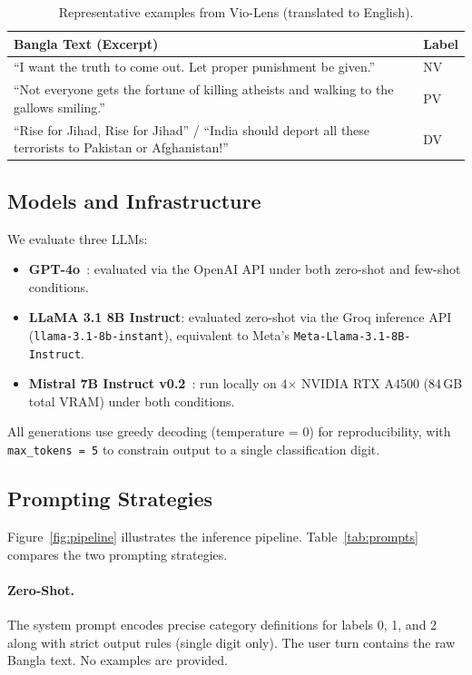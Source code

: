 \documentclass[sigconf,nonacm]{acmart}
\begin{document}
\begin{table}[t]
\caption{Representative examples from Vio-Lens (translated to English).}
\label{tab:examples}
\small
\begin{tabularx}{\columnwidth}{@{}p{}X@{}}
\toprule
\textbf{Bangla Text (Excerpt)} & \textbf{Label} \\
\midrule
``I want the truth to come out. Let proper punishment be given.'' & NV \\
\midrule
``Not everyone gets the fortune of killing atheists and walking to the gallows smiling.'' & PV \\
\midrule
``Rise for Jihad, Rise for Jihad'' / ``India should deport all these terrorists to Pakistan or Afghanistan!'' & DV \\
\bottomrule
\end{tabularx}
\end{table}

\subsection{Models and Infrastructure}

We evaluate three LLMs:
\begin{itemize}[leftmargin=*,topsep=2pt,itemsep=1pt]
  \item \textbf{GPT-4o}~\cite{openai2023gpt4}: evaluated via the OpenAI API under both zero-shot and few-shot conditions.
  \item \textbf{LLaMA 3.1 8B Instruct}: evaluated zero-shot via the Groq inference API (\texttt{llama-3.1-8b-instant}), equivalent to Meta's \texttt{Meta-Llama-3.1-8B-Instruct}.
  \item \textbf{Mistral 7B Instruct v0.2}~\cite{mistral7b}: run locally on 4$\times$ NVIDIA RTX A4500 (84\,GB total VRAM) under both conditions.
\end{itemize}

All generations use greedy decoding (temperature = 0) for reproducibility, with \texttt{max\_tokens = 5} to constrain output to a single classification digit.

\subsection{Prompting Strategies}

Figure~\ref{fig:pipeline} illustrates the inference pipeline. Table~\ref{tab:prompts} compares the two prompting strategies.

\paragraph{Zero-Shot.}
The system prompt encodes precise category definitions for labels 0, 1, and 2 along with strict output rules (single digit only). The user turn contains the raw Bangla text. No examples are provided.
\end{document}
